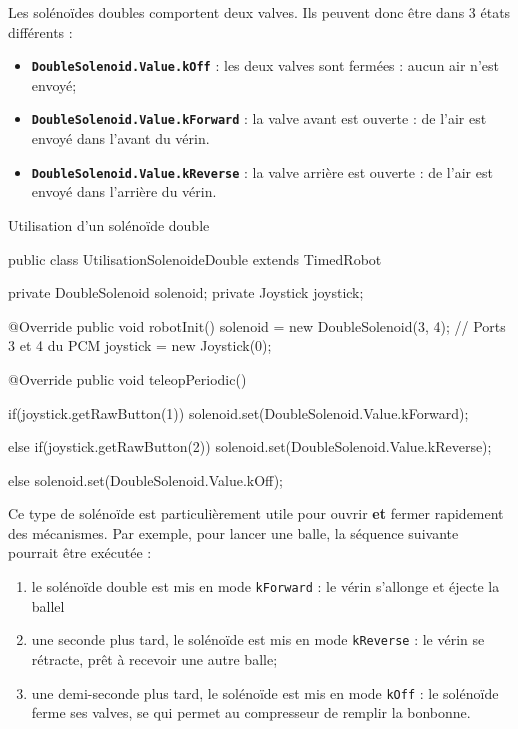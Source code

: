 \documentclass[12pt]{report}
\begin{document}
Les solénoïdes doubles comportent deux valves. Ils peuvent donc être dans 3 états différents :

\begin{itemize}
	\item \texttt{\bfseries DoubleSolenoid.Value.kOff} : les deux valves sont fermées : aucun air n'est envoyé;
	\item \texttt{\bfseries DoubleSolenoid.Value.kForward} : la valve avant est ouverte : de l'air est envoyé dans l'avant du vérin.
	\item \texttt{\bfseries DoubleSolenoid.Value.kReverse} : la valve arrière est ouverte : de l'air est envoyé dans l'arrière du vérin.
\end{itemize}

\begin{MyTCB}{Utilisation d'un solénoïde double}

public class UtilisationSolenoideDouble extends TimedRobot {
	
	private DoubleSolenoid solenoid;
	private Joystick joystick;
	
	@Override
	public void robotInit() {
		solenoid = new DoubleSolenoid(3, 4); // Ports 3 et 4 du PCM
		joystick = new Joystick(0);
	}
	
	@Override
	public void teleopPeriodic() {
	
		if(joystick.getRawButton(1))
			solenoid.set(DoubleSolenoid.Value.kForward);		
			
		else if(joystick.getRawButton(2))
			solenoid.set(DoubleSolenoid.Value.kReverse);
			
		else
			solenoid.set(DoubleSolenoid.Value.kOff);

	}

}

\end{MyTCB}

Ce type de solénoïde est particulièrement utile pour ouvrir \textbf{et} fermer rapidement des mécanismes. Par exemple, pour lancer une balle, la séquence suivante pourrait être exécutée :

\begin{enumerate}
	\item le solénoïde double est mis en mode \texttt{kForward} : le vérin s'allonge et éjecte la ballel
	\item une seconde plus tard, le solénoïde est mis en mode \texttt{kReverse} : le vérin se rétracte, prêt à recevoir une autre balle;
	\item une demi-seconde plus tard, le solénoïde est mis en mode \texttt{kOff} : le solénoïde ferme ses valves, se qui permet au compresseur de remplir la bonbonne.
\end{enumerate}
\end{document}

